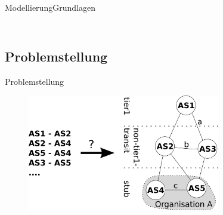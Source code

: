 \documentclass[ngerman,compress,hyperref={bookmarks}]{beamer}
\begin{document}
\begin{frame}{Modellierung}{Grundlagen}
\begin{columns}[c]
\begin{column}{0.3\textwidth}
\begin{figure}
      \end{figure}
    \end{column}
  \end{columns}
\end{frame}

\subsection{Problemstellung}
\begin{frame}{Problemstellung}
  \begin{figure}
    \includegraphics[width=0.75\textwidth]{images/Topologyinference}
  \end{figure}
\end{frame}


\end{document}
